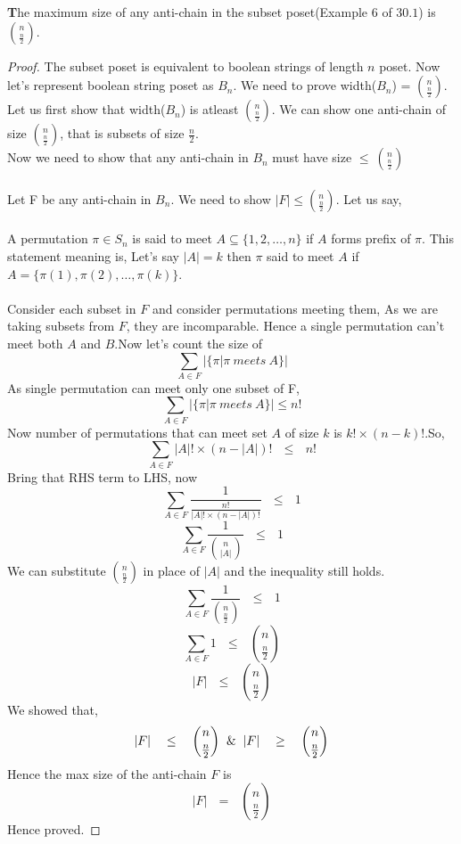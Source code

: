 \begin{theorem}
\textbf The maximum size of any anti-chain in the subset poset(Example $6$ of $30.1$) is $n \choose \frac{n}{2}$.
\begin{proof}
The subset poset is equivalent to boolean strings of length $n$ poset. Now let's represent boolean string poset as $B_n$. We need to prove width($B_n$) = $n \choose \frac{n}{2}$.\\
Let us first show that width($B_n$) is atleast $n \choose \frac{n}{2}$. We can show one anti-chain of size $n \choose \frac{n}{2}$, that is subsets of size $\frac{n}{2}.$\\
Now we need to show that any anti-chain in $B_n$ must have size $\leq ~{n \choose \frac{n}{2}}$\\\\
Let F be any anti-chain in $B_n$. We need to show $|F| \leq {n \choose \frac{n}{2}}$. Let us say,\\\\
A permutation $\pi \in S_n$ is said to meet $A \subseteq \{1,2,\ldots,n\}$ if $A$ forms prefix of $\pi$. This statement meaning is, Let's say $|A| = k$ then $\pi$ said to meet $A$ if $A = \{\pi(1),\pi(2),\ldots,\pi(k)\}$.\\\\

Consider each subset in $F$ and consider permutations meeting them, As we are taking subsets from $F$, they are incomparable. Hence a single permutation can't meet both $A$ and $B$.Now let's count the size of
$$\sum_{A\in F} \bigg|\{\pi | \pi ~meets~ A\}\bigg|$$
As single permutation can meet only one subset of F,
$$\sum_{A\in F} \bigg|\{\pi | \pi ~meets~ A\}\bigg| \leq n!$$
Now number of permutations that can meet set $A$ of size $k$ is $k! \times (n-k)!$.So,
$$\sum_{A\in F} |A|! \times (n-|A|)! ~~~\leq~~~ n!$$
Bring that RHS term to LHS, now 
$$\sum_{A\in F} \frac{1}{\frac{n!}{|A|! \times (n-|A|)!}} ~~~\leq~~~ 1$$
$$\sum_{A\in F} \frac{1}{{n \choose {|A|}}} ~~~ \leq ~~~ 1$$
We can substitute $n \choose \frac{n}{2}$ in place of $|A|$ and the inequality still holds.
$$\sum_{A\in F} \frac{1}{{n \choose \frac{n}{2}}} ~~~ \leq ~~~ 1$$
$$\sum_{A\in F} 1  ~~~ \leq ~~~ {n \choose \frac{n}{2}}$$
$$|F| ~~~\leq~~~ {n \choose \frac{n}{2}}$$
We showed that,
$$|F| ~~~\leq~~~ {n \choose \frac{n}{2}} \And |F| ~~~\geq~~~ {n \choose \frac{n}{2}}$$
Hence the max size of the anti-chain $F$ is 
$$|F| ~~~=~~~ {n \choose \frac{n}{2}} $$
Hence proved.
\end{proof}
\end{theorem}




